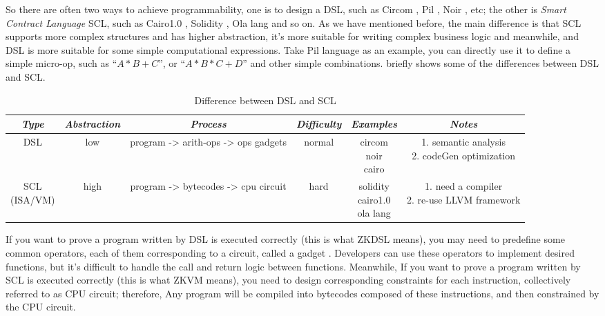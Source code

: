 So there are often two ways to achieve programmability, one is to design a DSL, such as Circom \cite{website:Circom}, Pil \cite{website:Pil}, Noir \cite{website:Noir}, etc; the other is \textit{Smart Contract Language} SCL, such as Cairo1.0 \cite{website:Cairo1.0}, Solidity \cite{website:Solidity}, Ola lang \cite{website:Ola-lang} and so on. As we have mentioned before, the main difference is that SCL supports more complex structures and has 
higher abstraction, it's more suitable for writing complex business logic and meanwhile, and DSL is more suitable for some simple computational expressions. 
Take Pil \cite{website:Pil} language as an example, you can directly use it to define a simple micro-op, such as ``$A * B + C$'', or ``$A * B * C + D$'' and other simple combinations. 
 briefly shows some of the differences between DSL and SCL.

\begin{table}[!ht]
    \centering
    \begin{tabular}{|c|c|c|c|c|c|}
        \hline
        \emph{Type} & \emph{Abstraction} & \emph{Process} & \emph{Difficulty} & \emph{Examples} & \emph{Notes} \\ 
        \hline
        DSL & low & program -> arith-ops -> ops gadgets & normal & \makecell{circom \\ noir \\ cairo} & \makecell{1. semantic analysis \\ 2. codeGen optimization} \\
        \hline
        \makecell{SCL \\ (ISA/VM)} & high & program -> bytecodes -> cpu circuit & hard & \makecell{solidity \\ cairo1.0 \\ ola lang} & \makecell{1. need a compiler \\2. re-use LLVM framework} \\
        \hline
    \end{tabular}
    \caption{Difference between DSL and SCL}
    \label{table:Difference between DSL and SCL}
\end{table}

If you want to prove a program written by DSL is executed correctly (this is what ZKDSL means), you may need to predefine some common operators, each of them corresponding to a circuit, called a gadget \cite{website:Gadget}. 
Developers can use these operators to implement desired functions, but it's difficult to handle the call and return logic between functions. Meanwhile, If you want to prove a program written by SCL is executed correctly (this is what ZKVM means), 
 you need to design corresponding constraints for each instruction, collectively referred to as CPU circuit; therefore, Any program will be compiled into 
 bytecodes composed of these instructions, and then constrained by the CPU circuit.

